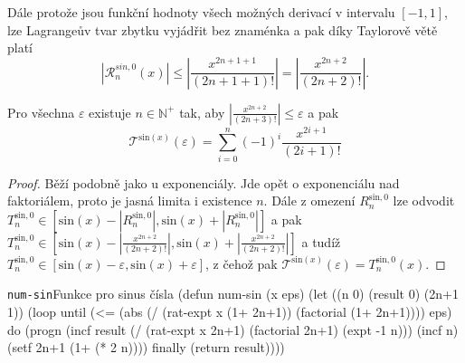 Dále protože jsou funkční hodnoty všech možných derivací v intervalu $[-1,1]$, lze Lagrangeův tvar zbytku vyjádřit bez znaménka a pak díky Taylorově větě platí
\begin{equation}
\left|\mathcal{R}^{sin, 0}_n(x)\right|\leq\left|\frac{x^{2n+1+1}}{(2n+1+1)!}\right|=\left|\frac{x^{2n+2}}{(2n+2)!}\right|.
\end{equation}

\begin{consequence}
Pro všechna $\varepsilon$ existuje $n\in\mathbb{N}^+$ tak, aby $\left|\frac{x^{2n+2}}{(2n+3)!}\right| \leq \varepsilon$ a pak
\begin{equation}
\mathcal{T}^{\mathrm{sin}(x)}(\varepsilon)=\sum_{i=0}^n (-1)^i \frac{x^{2i+1}}{(2i+1)!}
\end{equation}
\begin{proof}
Běží podobně jako u exponenciály. Jde opět o exponenciálu nad faktoriálem, proto je jasná limita i existence $n$. Dále z omezení $R^{\mathrm{sin}, 0}_n$ lze odvodit $T^{\mathrm{sin}, 0}_n\in[\mathrm{sin}(x)-|R^{\mathrm{sin}, 0}_n|,\mathrm{sin}(x)+|R^{\mathrm{sin}, 0}_n|]$ a pak $T^{\mathrm{sin}, 0}_n\in[\mathrm{sin}(x)-|\frac{x^{2n+2}}{(2n+2)!}|,\mathrm{sin}(x)+|\frac{x^{2n+2}}{(2n+2)!}|]$ a tudíž $T^{\mathrm{sin}, 0}_n\in[\mathrm{sin}(x)-\varepsilon,\mathrm{sin}(x)+\varepsilon]$, z čehož pak $\mathcal{T}^{\mathrm{sin}(x)}(\varepsilon)=T^{\mathrm{sin},0}_n(x)$.
\end{proof}
\end{consequence}

\begin{lispcode}{\texttt{num-sin}}{Funkce pro sinus čísla}
(\textcolor{funkcionalni}{defun} \textcolor{pojmenovan}{num-sin} (x eps)
  (\textcolor{vedlejsi}{let} ((n 0) (result 0) (2n+1 1))
    (\textcolor{funkcionalni}{loop} 
      \textcolor{obarvi}{until} (\textcolor{matematicke}{<=} (\textcolor{matematicke}{abs} (\textcolor{matematicke}{/} (\textcolor{moje}{rat-expt} x (\textcolor{matematicke}{1+} 2n+1))
                        (\textcolor{moje}{factorial} (\textcolor{matematicke}{1+} 2n+1))))
                eps)
      \textcolor{obarvi}{do} (\textcolor{funkcionalni}{progn} 
          (\textcolor{vedlejsi}{incf} result
            (\textcolor{matematicke}{/} (\textcolor{moje}{rat-expt} x 2n+1)
               (\textcolor{moje}{factorial} 2n+1)
               (\textcolor{matematicke}{expt} -1 n)))
          (\textcolor{vedlejsi}{incf} n)
          (\textcolor{vedlejsi}{setf} 2n+1 (\textcolor{matematicke}{1+} (\textcolor{matematicke}{*} 2 n))))
      \textcolor{obarvi}{finally} (\textcolor{funkcionalni}{return} result))))
\end{lispcode}

